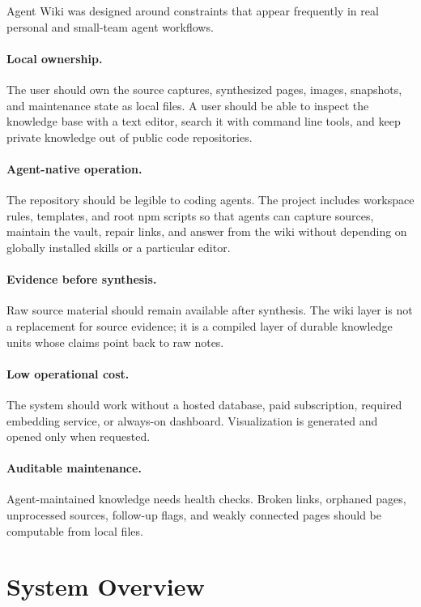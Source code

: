 \documentclass[10pt]{article}
\begin{document}
Agent Wiki was designed around constraints that appear frequently in real
personal and small-team agent workflows.

\paragraph{Local ownership.}
The user should own the source captures, synthesized pages, images, snapshots,
and maintenance state as local files. A user should be able to inspect the
knowledge base with a text editor, search it with command line tools, and keep
private knowledge out of public code repositories.

\paragraph{Agent-native operation.}
The repository should be legible to coding agents. The project includes
workspace rules, templates, and root npm scripts so that agents can capture
sources, maintain the vault, repair links, and answer from the wiki without
depending on globally installed skills or a particular editor.

\paragraph{Evidence before synthesis.}
Raw source material should remain available after synthesis. The wiki layer is
not a replacement for source evidence; it is a compiled layer of durable
knowledge units whose claims point back to raw notes.

\paragraph{Low operational cost.}
The system should work without a hosted database, paid subscription, required
embedding service, or always-on dashboard. Visualization is generated and opened
only when requested.

\paragraph{Auditable maintenance.}
Agent-maintained knowledge needs health checks. Broken links, orphaned pages,
unprocessed sources, follow-up flags, and weakly connected pages should be
computable from local files.

\section{System Overview}
\end{document}
